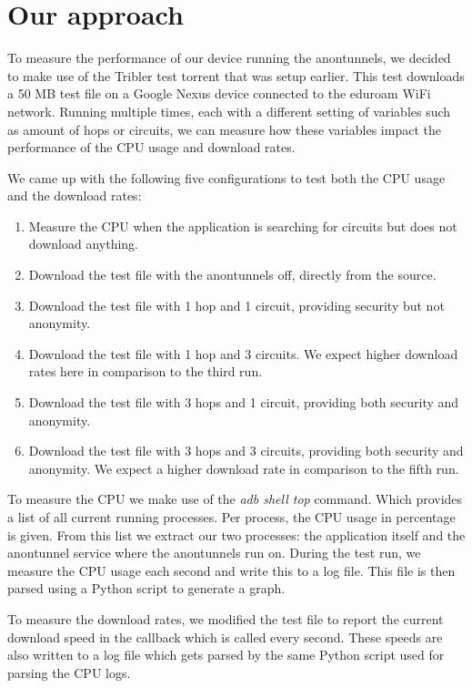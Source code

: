 \section{Our approach}
	\label{sec:approach}
	To measure the performance of our device running the anontunnels, we decided to make use of the Tribler test torrent that was setup earlier. This test downloads a 50 MB test file on a Google Nexus device connected to the eduroam WiFi network. Running multiple times, each with a different setting of variables such as amount of hops or circuits, we can measure how these variables impact the performance of the CPU usage and download rates.
	
	We came up with the following five configurations to test both the CPU usage and the download rates:
	
	\begin{enumerate}
		\item Measure the CPU when the application is searching for circuits but does not download anything.
		\item Download the test file with the anontunnels off, directly from the source.
		\item Download the test file with 1 hop and 1 circuit, providing security but not anonymity.
		\item Download the test file with 1 hop and 3 circuits. We expect higher download rates here in comparison to the third run.
		\item Download the test file with 3 hops and 1 circuit, providing both security and anonymity.
		\item Download the test file with 3 hops and 3 circuits, providing both security and anonymity. We expect a higher download rate in comparison to the fifth run.
	\end{enumerate}
	
	To measure the CPU we make use of the \emph{adb shell top} command. Which provides a list of all current running processes. Per process, the CPU usage in percentage is given. From this list we extract our two processes: the application itself  and the anontunnel service where the anontunnels run on. During the test run, we measure the CPU usage each second and write this to a log file. This file is then parsed using a Python script to generate a graph.
	
	To measure the download rates, we modified the test file to report the current download speed in the callback which is called every second. These speeds are also written to a log file which gets parsed by the same Python script used for parsing the CPU logs.